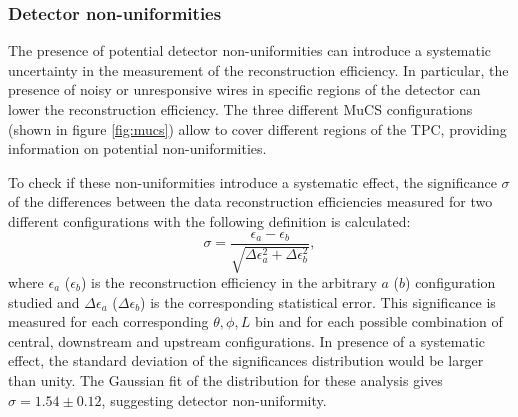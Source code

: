 \documentclass[a4paper,11pt]{article}
\begin{document}
\subsubsection{Detector non-uniformities}\label{sec:wires}
The presence of potential detector non-uniformities can introduce a systematic uncertainty in the measurement of the reconstruction efficiency. In particular, the presence of noisy or unresponsive wires in specific regions of the detector can lower the reconstruction efficiency. The three different MuCS configurations (shown in figure \ref{fig:mucs}) allow to cover different regions of the TPC, providing information on potential non-uniformities.

To check if these non-uniformities introduce a systematic effect, the significance $\sigma$ of the differences between the data reconstruction efficiencies measured for two different configurations with the following definition is calculated:
\begin{equation}
\sigma = \frac{\epsilon_a-\epsilon_b}{\sqrt{\Delta \epsilon_{a}^2 + \Delta \epsilon_b^2}},
\end{equation}
where $\epsilon_{a}$ ($\epsilon_{b}$) is the reconstruction efficiency in the arbitrary $a$ ($b$) configuration studied and $\Delta \epsilon_{a}$ ($\Delta \epsilon_{b}$) is the corresponding statistical error. This significance is measured for each corresponding $\theta,\phi,L$ bin and for each possible combination of central, downstream and upstream configurations. In presence of a systematic effect, the standard deviation of the significances distribution would be larger than unity. The Gaussian fit of the distribution for these analysis gives $\sigma = 1.54\pm0.12$, suggesting detector non-uniformity.


\end{document}
